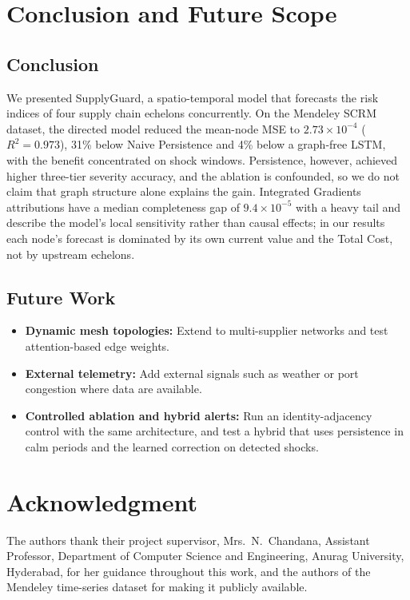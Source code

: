 \documentclass[conference]{IEEEtran}
\begin{document}
\section{Conclusion and Future Scope}
\subsection{Conclusion}
We presented SupplyGuard, a spatio-temporal model that forecasts the risk indices of four supply chain echelons concurrently. On the Mendeley SCRM dataset, the directed model reduced the mean-node MSE to $2.73\times10^{-4}$ ($R^2=0.973$), 31\% below Naive Persistence and 4\% below a graph-free LSTM, with the benefit concentrated on shock windows. Persistence, however, achieved higher three-tier severity accuracy, and the ablation is confounded, so we do not claim that graph structure alone explains the gain. Integrated Gradients attributions have a median completeness gap of $9.4\times10^{-5}$ with a heavy tail and describe the model's local sensitivity rather than causal effects; in our results each node's forecast is dominated by its own current value and the Total Cost, not by upstream echelons.

\subsection{Future Work}
\begin{itemize}
\item \textbf{Dynamic mesh topologies:} Extend to multi-supplier networks and test attention-based edge weights.
\item \textbf{External telemetry:} Add external signals such as weather or port congestion where data are available.
\item \textbf{Controlled ablation and hybrid alerts:} Run an identity-adjacency control with the same architecture, and test a hybrid that uses persistence in calm periods and the learned correction on detected shocks.
\end{itemize}

\section*{Acknowledgment}
The authors thank their project supervisor, Mrs.\ N.\ Chandana, Assistant Professor, Department of Computer Science and Engineering, Anurag University, Hyderabad, for her guidance throughout this work, and the authors of the Mendeley time-series dataset \cite{r3} for making it publicly available.
\end{document}

